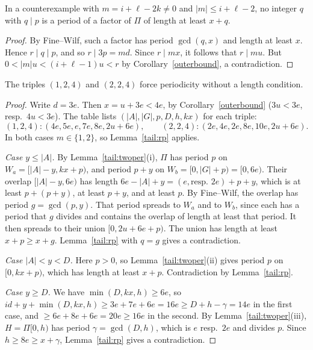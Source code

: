 \begin{lemma}\label{tail:rp}
In a counterexample with \(m=i+\ell-2k\ne0\) and \(|m|\le i+\ell-2\), no integer \(q\) with \(q\mid p\) is a period of a factor of \(\Pi\) of length at least \(x+q\).
\end{lemma}
\begin{proof}
By Fine--Wilf, such a factor has period \(\gcd(q,x)\) and length at least \(x\). Hence \(r\mid q\mid p\), and so \(r\mid 3p=md\). Since \(r\mid mx\), it follows that \(r\mid mu\). But \(0<|m|u<(i+\ell-1)u<r\) by Corollary~\ref{outerbound}, a contradiction.
\end{proof}

\begin{theorem}\label{tail:124}
The triples \((1,2,4)\) and \((2,2,4)\) force periodicity without a length condition.
\end{theorem}
\begin{proof}
Write \(d=3e\). Then \(x=u+3e<4e\), by Corollary~\ref{outerbound} (\(3u<3e\), resp.\ \(4u<3e\)). The table lists \((|A|,|G|,p,D,h,kx)\) for each triple:
\[
(1,2,4):(4e,5e,e,7e,8e,2u+6e),\qquad (2,2,4):(2e,4e,2e,8e,10e,2u+6e).
\]
In both cases \(m\in\{1,2\}\), so Lemma~\ref{tail:rp} applies.

\emph{Case \(y\le|A|\).} By Lemma~\ref{tail:twoper}(i), \(\Pi\) has period \(p\) on \(W_a=[|A|-y,kx+p)\), and period \(p+y\) on \(W_b=[0,|G|+p)=[0,6e)\). Their overlap \([|A|-y,6e)\) has length \(6e-|A|+y=(e,\text{resp. }2e)+p+y\), which is at least \(p+(p+y)\), at least \(p+y\), and at least \(p\). By Fine--Wilf, the overlap has period \(g=\gcd(p,y)\). That period spreads to \(W_a\) and to \(W_b\), since each has a period that \(g\) divides and contains the overlap of length at least that period. It then spreads to their union \([0,2u+6e+p)\). The union has length at least \(x+p\ge x+g\). Lemma~\ref{tail:rp} with \(q=g\) gives a contradiction.

\emph{Case \(|A|<y<D\).} Here \(p>0\), so Lemma~\ref{tail:twoper}(ii) gives period \(p\) on \([0,kx+p)\), which has length at least \(x+p\). Contradiction by Lemma~\ref{tail:rp}.

\emph{Case \(y\ge D\).} We have \(\min(D,kx,h)\ge6e\), so \(id+y+\min(D,kx,h)\ge 3e+7e+6e=16e\ge D+h-\gamma=14e\) in the first case, and \(\ge 6e+8e+6e=20e\ge16e\) in the second. By Lemma~\ref{tail:twoper}(iii), \(H=\Pi[0,h)\) has period \(\gamma=\gcd(D,h)\), which is \(e\) resp.\ \(2e\) and divides \(p\). Since \(h\ge 8e\ge x+\gamma\), Lemma~\ref{tail:rp} gives a contradiction.
\end{proof}

